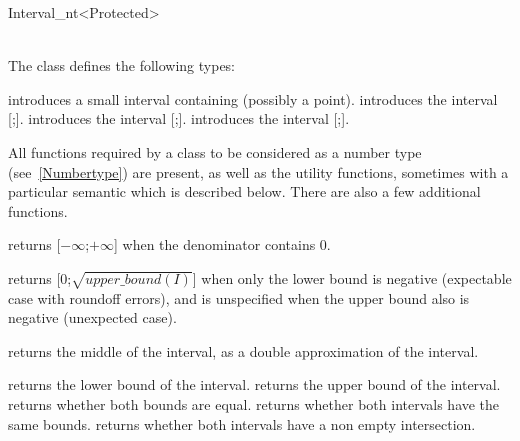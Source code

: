 \begin{ccRefClass}{Interval_nt<Protected>}
\ccIsModel
{}\\
\\

\ccTypes
The class  defines the following types:
\ccGlue
{}
\ccGlue
{}


\ccCreation

{introduces a small interval containing  (possibly a point).}
\ccGlue
{}
{introduces the interval [;].}
\ccGlue
{}
{introduces the interval [;].}
\ccGlue
{}
{introduces the interval [;].}


\ccOperations

All functions required by a class to be considered as a {\cgal} number type
(see~\ref{Numbertype}) are present, as well as the utility functions,
sometimes with a particular semantic which is described below.  There are also
a few additional functions.


 {returns
[$-\infty$;$+\infty$] when the denominator contains 0.}

 {returns
[0;$\sqrt{upper\_bound(I)}$] when only the lower bound is negative (expectable
case with roundoff errors), and is unspecified when the upper bound also is
negative (unexpected case).}

 {returns the
middle of the interval, as a double approximation of the interval.}

 {returns the lower bound of the interval.}
 {returns the upper bound of the interval.}
 {returns whether both bounds are equal.}
 {returns whether both intervals have
the same bounds.}
 {returns whether both intervals
have a non empty intersection.}


\end{ccRefClass}
